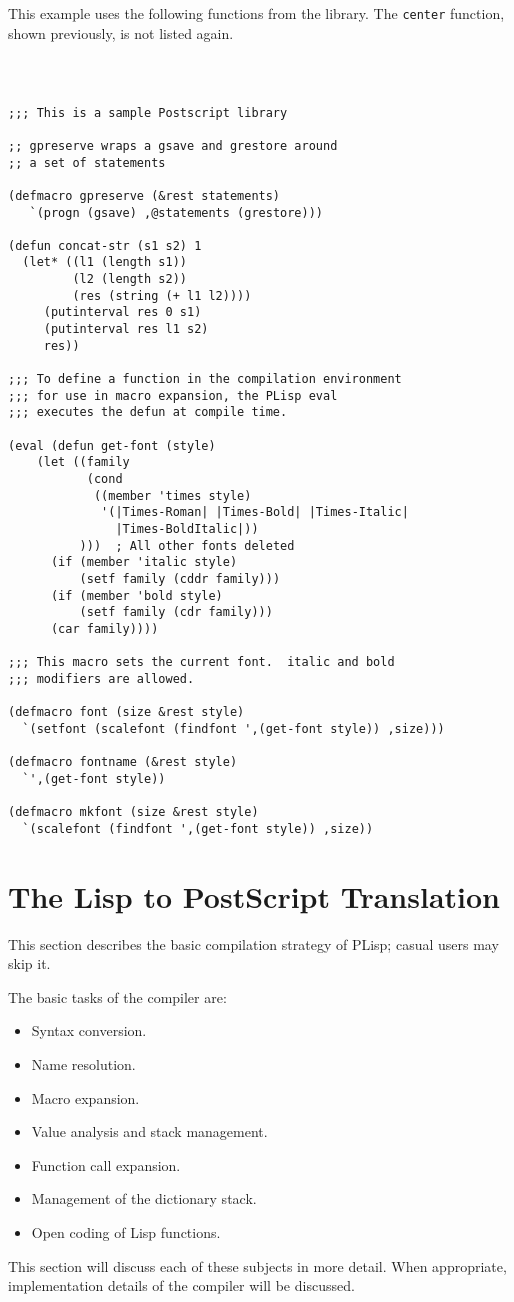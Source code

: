 This example uses the following functions from the library.
The {\tt center} function, shown previously, is not listed again.

{\tt
\begin{verbatim}

;;; This is a sample Postscript library

;; gpreserve wraps a gsave and grestore around
;; a set of statements

(defmacro gpreserve (&rest statements)
   `(progn (gsave) ,@statements (grestore)))

(defun concat-str (s1 s2) 1
  (let* ((l1 (length s1))
         (l2 (length s2))
         (res (string (+ l1 l2))))
     (putinterval res 0 s1)
     (putinterval res l1 s2)
     res))

;;; To define a function in the compilation environment
;;; for use in macro expansion, the PLisp eval
;;; executes the defun at compile time.

(eval (defun get-font (style)
    (let ((family
           (cond
            ((member 'times style)
             '(|Times-Roman| |Times-Bold| |Times-Italic|
               |Times-BoldItalic|))
          )))  ; All other fonts deleted 
      (if (member 'italic style)
          (setf family (cddr family)))
      (if (member 'bold style)
          (setf family (cdr family)))
      (car family))))

;;; This macro sets the current font.  italic and bold
;;; modifiers are allowed.

(defmacro font (size &rest style)
  `(setfont (scalefont (findfont ',(get-font style)) ,size)))
 
(defmacro fontname (&rest style)
  `',(get-font style))

(defmacro mkfont (size &rest style)
  `(scalefont (findfont ',(get-font style)) ,size))

\end{verbatim}
}

\section{The Lisp to PostScript Translation}
This section describes the basic compilation strategy of PLisp;
casual users may skip it.

The basic tasks of the compiler are:
\begin{itemize}
\item Syntax conversion.
\item Name resolution.
\item Macro expansion.
\item Value analysis and stack management.
\item Function call expansion.
\item Management of the dictionary stack.
\item Open coding of Lisp functions.
\end{itemize}
This section will discuss each of these subjects in more detail.  When
appropriate, implementation details of the compiler will be discussed.

